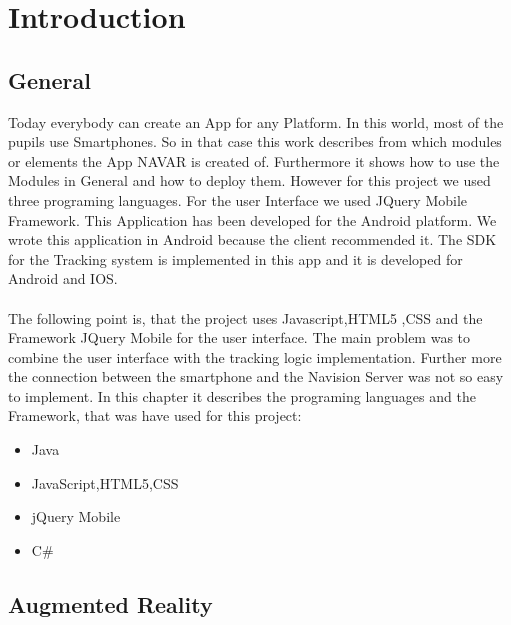 \chapter{Introduction}  \label{chapter:intro}
\section{General}
 Today everybody can create an App for any Platform. In this world, most of the pupils use Smartphones. So in that case this work describes from which modules or elements  the App NAVAR is created of.  Furthermore it shows how to use the Modules in General and how to deploy them. However for this project we used three programing languages. For the user Interface we used JQuery Mobile Framework. This Application has been developed for the Android platform.  We wrote this application in Android because the client recommended it. The SDK  for the Tracking system is implemented  in this app and it is developed for Android and IOS.   
 \\\\
 The following point is, that the project uses Javascript,HTML5 ,CSS  and the Framework JQuery Mobile for the user interface. The main problem was to combine the user interface with the tracking logic implementation. Further more the connection between the smartphone and the Navision Server was not so easy to implement.
 In this chapter it describes the programing languages and the Framework, that was have used for this project:
 \begin{itemize}
 \item Java
 \item JavaScript,HTML5,CSS
 \item jQuery Mobile
 \item C\#
 \end{itemize}
 \newpage
 \section{Augmented Reality}
